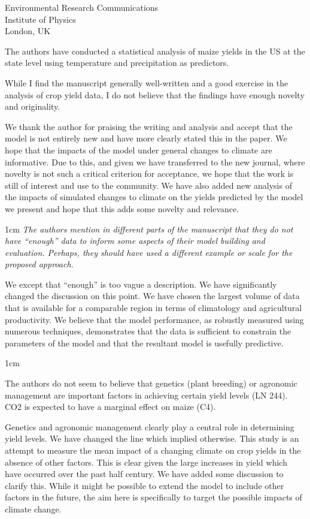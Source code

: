 \documentclass{letter}
\newcommand{\review}[1]{   
    \begin{adjustwidth}{1cm}{}
    \em{#1}
    \end{adjustwidth}
    }
\begin{document}
\begin{letter}{Environmental Research Communications \\ Institute of Physics \\ London, UK}
{The authors have conducted a statistical analysis of maize yields in the US at the state level using temperature and precipitation as predictors.

While I find the manuscript generally well-written and a good exercise in the analysis of crop yield data, I do not believe that the findings have enough novelty and originality.
}

We thank the author for praising the writing and analysis and accept that the model is not entirely new and have more clearly stated this in the paper. We hope that the impacts of the model under general changes to climate are informative. Due to this, and given we have transferred to the new journal, where novelty is not such a critical criterion for acceptance, we hope that the work is still of interest and use to the community. We have also added new analysis of the impacts of simulated changes to climate on the yields predicted by the model we present and hope that this adds some novelty and relevance.

\review{
The authors mention in different parts of the manuscript that they do not have ``enough'' data to inform some aspects of their model building and evaluation. Perhaps, they should have used a different example or scale for the proposed approach.
}

We except that ``enough'' is too vague a description. We have significantly changed the discussion on this point. We have chosen the largest volume of data that is available for a comparable region in terms of climatology and agricultural productivity. We believe that the model performance, as robustly measured using numerous techniques, demonstrates that the data is sufficient to constrain the parameters of the model and that the resultant model is usefully predictive.

\review{
The authors do not seem to believe that genetics (plant breeding) or agronomic management are important factors in achieving certain yield levels (LN 244). CO2 is expected to have a marginal effect on maize (C4).

}

Genetics and agronomic management clearly play a central role in determining yield levels. We have changed the line which implied otherwise. This study is an attempt to measure the mean impact of a changing climate on crop yields in the absence of other factors. This is clear given the large increases in yield which have occurred over the past half century. We have added some discussion to clarify this. While it might be possible to extend the model to include other factors in the future, the aim here is specifically to target the possible impacts of climate change.


\end{letter}
\end{document}
